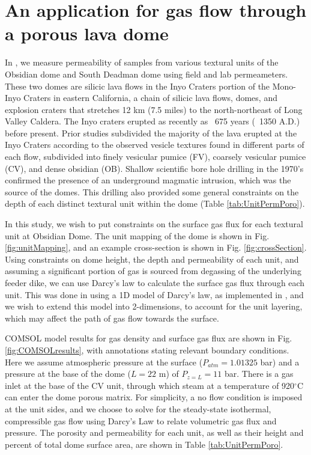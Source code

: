 \documentclass[11pt]{amsart}
\begin{document}
\section{An application for gas flow through a porous lava dome}

In \cite{Graham2023}, we measure permeability of samples from various textural units of the Obsidian dome and South Deadman dome using field and lab permeameters. These two domes are silicic lava flows in the Inyo Craters portion of the Mono-Inyo Craters in eastern California, a chain of silicic lava flows, domes, and explosion craters that stretches 12 km (7.5 miles) to the north-northeast of Long Valley Caldera. The Inyo craters erupted as recently as ~675 years (~1350 A.D.) before present. Prior studies subdivided the majority of the lava erupted at the Inyo Craters according to the observed vesicle textures found in different parts of each flow, subdivided into finely vesicular pumice (FV), coarsely vesicular pumice (CV), and dense obsidian (OB). Shallow scientific bore hole drilling in the 1970's confirmed the presence of an underground magmatic intrusion, which was the source of the domes. This drilling also provided some general constraints on the depth of each distinct textural unit within the dome (Table \ref{tab:UnitPermPoro}).

In this study, we wish to put constraints on the surface gas flux for each textural unit at Obsidian Dome. The unit mapping of the dome is shown in Fig. \ref{fig:unitMapping}, and an example cross-section is shown in Fig. \ref{fig:crossSection}. Using constraints on dome height, the depth and permeability of each unit, and assuming a significant portion of gas is sourced from degassing of the underlying feeder dike, we can use Darcy's law to calculate the surface gas flux through each unit. This was done in \cite{Graham2023} using a 1D model of Darcy's law, as implemented in \cite{Edmonds2003}, and we wish to extend this model into 2-dimensions, to account for the unit layering, which may affect the path of gas flow towards the surface.

COMSOL model results for gas density and surface gas flux are shown in Fig. \ref{fig:COMSOLresults}, with annotations stating relevant boundary conditions. Here we assume atmospheric pressure at the surface ($P_{atm} = 1.01325$ bar) and a pressure at the base of the dome ($L=22$ m) of $P_{z=L} = 11$ bar. There is a gas inlet at the base of the CV unit, through which steam at a temperature of 920$^{\circ}$C can enter the dome porous matrix. For simplicity, a no flow condition is imposed at the unit sides, and we choose to solve for the steady-state isothermal, compressible gas flow using Darcy's Law to relate volumetric gas flux and pressure. The porosity and permeability for each unit, as well as their height and percent of total dome surface area, are shown in Table \ref{tab:UnitPermPoro}.
\end{document}
